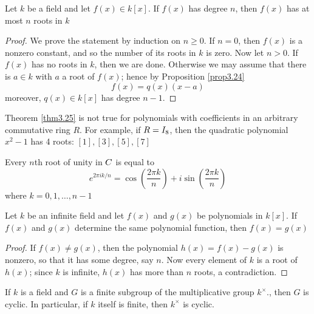 \documentclass[11pt]{article}
\begin{document}
\begin{theorem}[]
\label{thm3.25}
Let \(k\) be a field and let \(f(x)\in k[x]\). If \(f(x)\) has degree \(n\), then
\(f(x)\) has at most \(n\) roots in \(k\)
\end{theorem}

\begin{proof}
We prove the statement by induction on \(n\ge 0\). If \(n=0\), then \(f(x)\) is a
nonzero constant, and so the number of its roots in \(k\) is zero. Now let
\(n>0\). If \(f(x)\) has no roots in \(k\), then we are done. Otherwise we may
assume that there is \(a\in k\) with \(a\) a root of \(f(x)\); hence by Proposition
\ref{prop3.24}
\begin{equation*}
f(x)=q(x)(x-a)
\end{equation*}
moreover, \(q(x)\in k[x]\) has degree \(n-1\). 
\end{proof}

\begin{examplle}[]
Theorem \ref{thm3.25} is not true for polynomials with coefficients in an
arbitrary commutative ring \(R\). For example, if \(R=\relax{I}_8\), then the quadratic
polynomial \(x^2-1\) has 4 roots: \([1],[3],[5],[7]\)
\end{examplle}


\begin{corollary}[]
Every \(n\)th root of unity in \(\relax{C}\)  is equal to
\begin{equation*}
e^{2\pi ik/n}=\cos\left(\frac{2\pi k}{n}\right)+i\sin\left(\frac{2\pi k}{n}\right)
\end{equation*}
where \(k=0,1,\dots,n-1\)
\end{corollary}

\begin{corollary}[]
Let \(k\) be an infinite field and let \(f(x)\) and \(g(x)\) be polynomials in
\(k[x]\). If \(f(x)\) and \(g(x)\) determine the same polynomial function, then
\(f(x)=g(x)\) 
\end{corollary}

\begin{proof}
If \(f(x)\neq g(x)\), then the polynomial \(h(x)=f(x)-g(x)\) is nonzero, so that
it has some degree, say \(n\). Now every element of \(k\) is a root of \(h(x)\);
since \(k\) is infinite, \(h(x)\) has more than \(n\) roots, a contradiction.
\end{proof}

\begin{theorem}[]
\label{nthm2.46}
If \(k\) is a field and \(G\) is a finite subgroup of the multiplicative group
\(k^\times\)., then \(G\) is cyclic. In particular, if \(k\) itself is finite, then
\(k^\times\) is cyclic.
\end{theorem}
\end{document}
